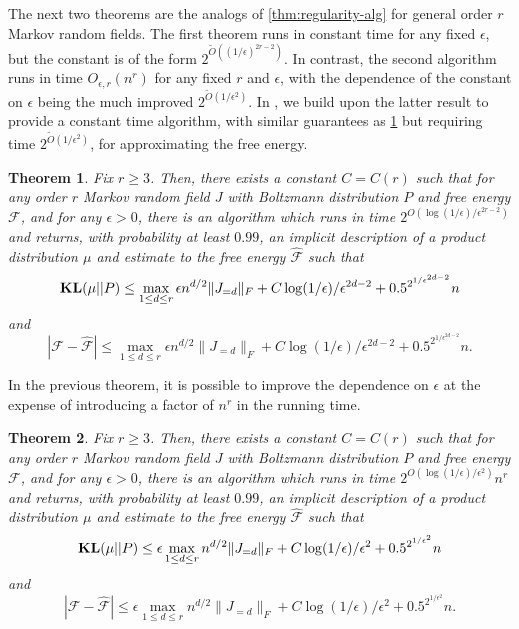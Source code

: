 \documentclass[final, 12pt]{colt2018}
\newcommand{\bE}{\mathbb{E}}
\newcommand{\F}{\mathcal{F}}
\newcommand{\E}{\bE}      %
\newcommand{\KL}{\mathop{\bf KL\/}}
\newcommand{\fnote}[1]{\textcolor{blue}{\small {\textbf{(Fred: }#1\textbf{) }}}}
\newtheorem{theorem}{Theorem}[section]
\theoremstyle{definition}
\theoremstyle{plain}
\begin{document}
The next two theorems are the analogs of \cref{thm:regularity-alg} for general order $r$ Markov random fields. The first theorem runs in constant time for any fixed $\epsilon$, but the constant is of the form $2^{\tilde{O}((1/\epsilon)^{2r-2})}$. In contrast, the second algorithm runs in time $O_{\epsilon,r}(n^r)$ for any fixed $r$ and $\epsilon$, with the dependence of the  constant on $\epsilon$ being the much improved $2^{\tilde{O}(1/\epsilon^{2})}$. In \citep{second-paper}, we build upon the latter result to provide a constant time algorithm, with similar guarantees as \cref{thm:algo-mrf-regularity-bad-dependence} but requiring time $2^{\tilde{O}(1/\epsilon^{2})}$, for approximating the free energy.      
\begin{theorem}
\label{thm:algo-mrf-regularity-bad-dependence}
Fix $r \geq 3$. Then, there exists a constant $C=C(r)$  such that for any order $r$ Markov random field $J$ with Boltzmann distribution $P$ and free energy $\F$, and for any $\epsilon >0$, there is an algorithm which runs in time $2^{O(\log(1/\epsilon)/\epsilon^{2r-2})}$ and
returns, with probability at least $0.99$, an implicit description of a product distribution $\mu$
and estimate to the free energy $\hat{\mathcal{F}}$
such that
\[ \KL(\mu || P) \le \max_{1\leq d\leq r} \epsilon n^{d/2} \|J_{=d}\|_F  + C\log(1/\epsilon)/\epsilon^{2d-2} + 0.5^{2^{1/\epsilon^{2d-2} }} n \]
and
\[ |\mathcal{F} - \hat{\mathcal{F}}| \le \max_{1\leq d\leq r} \epsilon n^{d/2} \|J_{=d}\|_F  + C\log(1/\epsilon)/\epsilon^{2d-2} + 0.5^{2^{1/\epsilon^{2d-2} }} n. \]
\end{theorem}

In the previous theorem, it is possible to improve the dependence on $\epsilon$ at the expense of introducing a factor of $n^r$ in the running time. 
\begin{theorem}
\label{thm:algo-mrf-dependence-on-n}
Fix $r \geq 3$. Then, there exists a constant $C=C(r)$ such that for any order $r$ Markov random field $J$ with Boltzmann distribution $P$ and free energy $\F$, and for any $\epsilon > 0$, there is an algorithm which runs in time $2^{O(\log(1/\epsilon)/\epsilon^2)}n^{r}$ and
returns, with probability at least $0.99$, an implicit description of a product distribution $\mu$
and estimate to the free energy $\hat{\mathcal{F}}$
such that
\[ \KL(\mu || P) \le \epsilon \max_{1\leq d\leq r}n^{d/2} \|J_{=d}\|_F  + C\log(1/\epsilon)/\epsilon^2 + 0.5^{2^{1/\epsilon^2}} n \]
and
\[ |\mathcal{F} - \hat{\mathcal{F}}| \le \epsilon \max_{1\leq d\leq r}n^{d/2} \|J_{=d}\|_F  + C\log(1/\epsilon)/\epsilon^2 + 0.5^{2^{1/\epsilon^2}} n. \]
\end{theorem}
\end{document}
